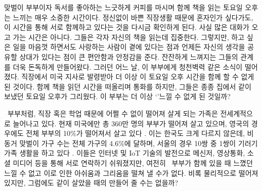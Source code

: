 맞벌이 부부이자 독서를 좋아하는 \B\와  느긋하게 커피를 마시며 함께 책을 읽는 토요일 오후는 \concept\을 느끼는 매우 소중한 시간이다. 정신없이 바쁜 직장생활 때문에 혼자인가 싶다가도, 이 시간을 통해 서로 함께하고 있다는 것을 다시금 확인하게 된다. 사실 많은 대화가 오고 가는 시간은 아니다. 그들은 각자 자신의 책을 읽는데 집중한다. 그렇지만, 하고 싶은 일을 마음껏 하면서도 사랑하는 사람이 곁에 있다는 점과 언제든 자신의 생각을 공유할 상대가 있다는 점이 \A\와  큰 편안함과 안정감을 준다. 잔잔하게 느껴지는 \concept\은 그들의 관계를 더욱 돈독하게 만들어왔다. 그러던 어느 날, 이 부부에게 청천벽력 같은 소식이 떨어졌다. \A\가 직장에서 미국 지사로 발령받아 더 이상 이 토요일 오후 시간을 함께 할 수 없게 된 것이다. 함께 책을 읽던 시간을 떠올리며 통화를 하지만, 그들은 종종 집에서 같이 보냈던 토요일 오후가 그리웠다. 이 부부는 더 이상 `\concept'\을 느낄 수 없게 된 것일까?

\A\와 \B\ 부부처럼, 직장 혹은 학업 때문에 어쩔 수 없이 떨어져 살게 되는 가족은 전세계적으로 늘어나고 있다. 현재 미국에만 총 360만 명의 부부가 떨어져 살고 있으며, 영국의 경우에도 전체 부부의 10\%가 떨어져서 살고 있다 \cite{duncan2013people, strohm2009living}. 이는 한국도 크게 다르지 않은데, 비동거 맞벌이 가구 수는 전체 가구의 4.6\%에 달하며, 서울의 경우 10쌍 중 1쌍이 기러기 가족 생활을 하고 있다 \cite{rock2016goose, wise2012seoul}. 이들은 인터넷 및 IoT 기술의 발전으로 메신저, 영상통화, 소셜 미디어 등을 통해 서로 연락하기 쉬워졌지만, 여전히 \A\와 \B\ 부부가 함께 있을 때 느꼈던 \concept\을 느낄 수 없고 이로 인한 아쉬움과 그리움을 떨쳐 낼 수가 없다.
비록 물리적으로 떨어져 있지만, 그럼에도 같이 살았을 때의 \concept\을 만들어 줄 수는 없을까? 



